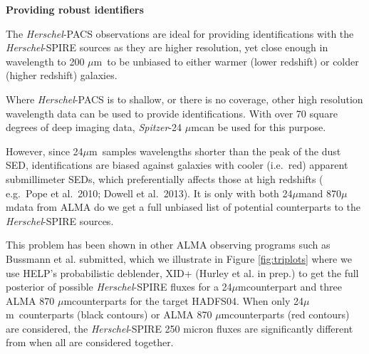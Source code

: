 \documentclass[12pt,a4paper]{article}
\newcommand{\herschel}{{\it Herschel}}
\newcommand{\spitzer}{{\it Spitzer}}
\newcommand{\ea}{et~al.}
\newcommand{\micron}{$\mu$m}
\begin{document}
%


{\bf Providing robust identifiers}
%

The \herschel-PACS observations are ideal for providing identifications with the  \herschel-SPIRE sources as they are higher resolution, yet close enough in wavelength to 200 \micron\ to be unbiased to either warmer (lower redshift) or colder (higher redshift) galaxies. 

Where \herschel-PACS is to shallow, or there is no coverage, other high resolution wavelength data can be used to provide identifications. With over 70 square degrees of deep imaging data, \spitzer-24 \micron can be used for this purpose. 

However, since 24\micron\ samples wavelengths shorter than the peak of the dust SED, identifications are biased against galaxies with cooler (i.e.\ red) apparent submillimeter SEDs, which preferentially affects those at
high redshifts ( e.g.\ Pope et al.\ 2010; Dowell et al.\ 2013). It is only with both 24\micron and 870\micron data from ALMA do we get a full unbiased list of potential counterparts to the \herschel-SPIRE sources.

This problem has been shown in other ALMA observing programs such as Bussmann et al. submitted, which we illustrate in Figure \ref{fig:triplots} where we use HELP's probabilistic deblender, XID+ (Hurley et al. in prep.) to get the full posterior of possible \herschel-SPIRE fluxes for a 24\micron counterpart and three ALMA 870 \micron counterparts for the target HADFS04. When only 24\micron\ counterparts (black contours) or ALMA 870 \micron counterparts (red contours) are considered, the \herschel-SPIRE 250 micron fluxes are significantly different from when all are considered together.
\end{document}
